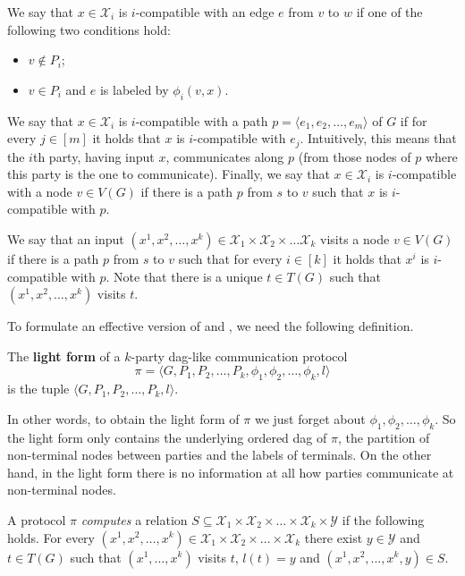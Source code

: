 \documentclass{toc}
\begin{document}
We say that $x\in\mathcal{X}_i$ is $i$-compatible with an edge $e$ from
$v$ to $w$ if one of the following two %
conditions hold:  %
\begin{itemize}
\item $v\notin P_i$;
\item $v\in P_i$ and $e$ is labeled by $\phi_i(v, x)$.
\end{itemize}
We say that $x\in \mathcal{X}_i$ is $i$-compatible with  a path $p = \langle e_1, e_2, \ldots, e_m\rangle$ of $G$ if for every $j\in [m]$ it holds that $x$ is $i$-compatible with $e_j$. Intuitively, this means that the $i$th party, having input $x$, communicates along $p$ (from those nodes of $p$ where this party is the one to communicate).
Finally, we say that $x\in\mathcal{X}_i$ is $i$-compatible with a node $v\in V(G)$ if there is a path $p$ from $s$ to $v$ such that $x$ is $i$-compatible with $p$.

We say that an input  $(x^1, x^2, \ldots, x^k) \in \mathcal{X}_1 \times \mathcal{X}_2 \times \ldots \mathcal{X}_k$ visits a node $v\in V(G)$ if there is a path $p$ from $s$ to $v$ such that for every $i\in [k]$ it holds that $x^i$ is $i$-compatible with $p$. Note that there is a unique $t\in T(G)$ such that $(x^1, x^2, \ldots, x^k)$ visits $t$.





To formulate an effective version of  and , we need the following definition.
\begin{definition}
\label{light_form}
The \textbf{light form} of a $k$-party dag-like communication protocol
%
\[
\pi = \langle G, P_1, P_2, \ldots, P_k, \phi_1, \phi_2, \ldots, \phi_k, l\rangle
\]
is %
%
%
the  %
tuple $\langle G, P_1, P_2, \ldots, P_k, l\rangle$.
\end{definition}
%
In other words,  %
to obtain the light form of $\pi$ we just forget about $\phi_1, \phi_2, \ldots, \phi_k$. %
So  %
the light form only contains  the underlying ordered dag of $\pi$, the partition of non-terminal nodes between parties and the labels of terminals. On the other hand, in the light form there is no information at all how parties communicate at non-terminal nodes.



A protocol $\pi$ \emph{computes} a relation $S\subseteq \mathcal{X}_1\times\mathcal{X}_2\times\ldots\times \mathcal{X}_k\times\mathcal{Y}$ if the following holds. For every $(x^1, x^2, \ldots, x^k) \in  \mathcal{X}_1\times\mathcal{X}_2\times\ldots\times \mathcal{X}_k$ there exist $y\in \mathcal{Y}$ and $t\in T(G)$ such that $(x^1, \ldots, x^k)$ visits $t$, $l(t) = y$ and $(x^1, x^2, \ldots, x^k, y) \in S$.
\end{document}
